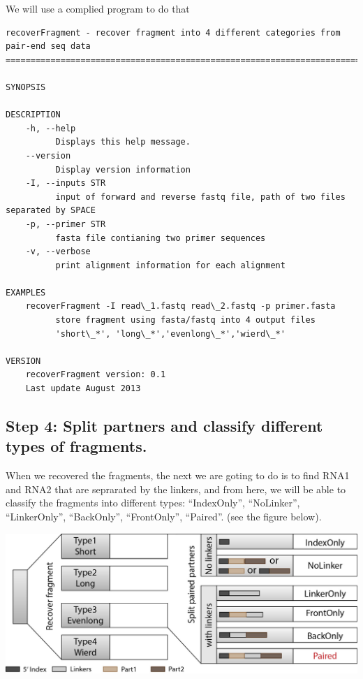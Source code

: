 \documentclass[letterpaper,10pt,english]{sphinxmanual}
\begin{document}
We will use a complied program  to do that

\begin{Verbatim}[commandchars=\\\{\}]
recoverFragment - recover fragment into 4 different categories from pair-end seq data
=====================================================================================

SYNOPSIS

DESCRIPTION
    -h, --help
          Displays this help message.
    --version
          Display version information
    -I, --inputs STR
          input of forward and reverse fastq file, path of two files separated by SPACE
    -p, --primer STR
          fasta file contianing two primer sequences
    -v, --verbose
          print alignment information for each alignment

EXAMPLES
    recoverFragment -I read\_1.fastq read\_2.fastq -p primer.fasta
          store fragment using fasta/fastq into 4 output files
          'short\_*', 'long\_*','evenlong\_*','wierd\_*'

VERSION
    recoverFragment version: 0.1
    Last update August 2013
\end{Verbatim}


\subsection{Step 4: Split partners and classify different types of fragments.}
\label{Analysis_pipeline:step4}\label{Analysis_pipeline:step-4-split-partners-and-classify-different-types-of-fragments}
When we recovered the fragments, the next we are goting to do is to find RNA1 and RNA2 that are seprarated by the linkers, and from here, we will be able to classify the fragments into different types: ``IndexOnly'', ``NoLinker'', ``LinkerOnly'', ``BackOnly'', ``FrontOnly'', ``Paired''. (see the figure below).

{\hfill\includegraphics{summary.jpg}\hfill}
\end{document}
